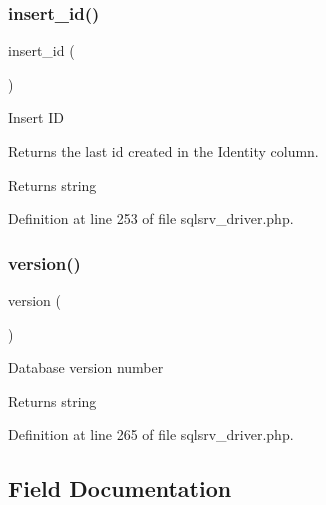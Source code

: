 \mbox{\label{class_c_i___d_b__sqlsrv__driver_a933f2cde8dc7f87875e257d0a4902e99}} 
\subsubsection{\texorpdfstring{insert\_id()}{insert\_id()}}
{\footnotesize\ttfamily insert\+\_\+id (\begin{DoxyParamCaption}{ }\end{DoxyParamCaption})}

Insert ID

Returns the last id created in the Identity column.

\begin{DoxyReturn}{Returns}
string 
\end{DoxyReturn}


Definition at line 253 of file sqlsrv\+\_\+driver.\+php.

\mbox{\label{class_c_i___d_b__sqlsrv__driver_a6080dae0886626b9a4cedb29240708b1}} 
\subsubsection{\texorpdfstring{version()}{version()}}
{\footnotesize\ttfamily version (\begin{DoxyParamCaption}{ }\end{DoxyParamCaption})}

Database version number

\begin{DoxyReturn}{Returns}
string 
\end{DoxyReturn}


Definition at line 265 of file sqlsrv\+\_\+driver.\+php.



\subsection{Field Documentation}
\mbox{\label{class_c_i___d_b__sqlsrv__driver_a1dae2f0e9ad7299438a9976d6cdbf2ad}} 

